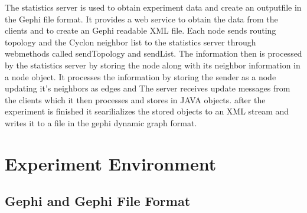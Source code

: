 The statistics server is used to obtain experiment data and create an outputfile
in the Gephi file format. It provides a web service to obtain the data from the
clients and to create an Gephi readable XML file.  Each node sends routing
topology and the Cyclon neighbor list to the statistics server
through webmethods called sendTopology and sendList. The information then is
processed by the statistics server by storing the node along with its neighbor
information in a node object.  It processes the information by storing the
sender as a node updating it's neighbors as edges and The server receives update messages from the clients which it then processes and stores in JAVA objects.
after the experiment is finished it searilializes the stored objects to an XML
stream and writes it to a file in the gephi dynamic graph format.



\section{Experiment Environment}

\subsection{Gephi and Gephi File Format}
